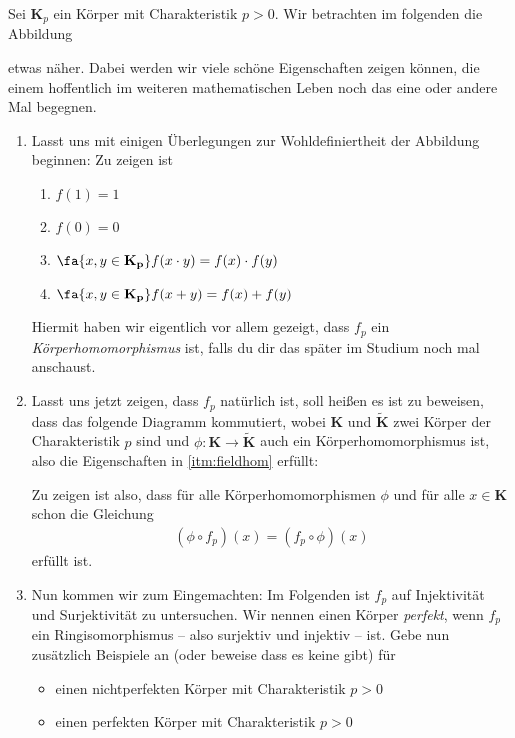 \begin{prob}
  Sei $\mathbf{K}_p$ ein Körper mit Charakteristik $p>0$. Wir betrachten im
  folgenden die Abbildung
  \begin{center}
    
  \end{center}
  etwas näher. Dabei werden wir viele schöne Eigenschaften zeigen können, die
  einem hoffentlich im weiteren mathematischen Leben noch das eine oder andere Mal
  begegnen.

  \begin{enumerate}[label=(\alph*)]
  \item \label{itm:fieldhom}Lasst uns mit einigen Überlegungen zur
    Wohldefiniertheit der Abbildung beginnen: Zu zeigen ist
    \begin{enumerate}[label=\roman*.]
    \item $f(1) = 1$
    \item $f(0) = 0$
    \item $\fa{x, y \in \mathbf{K_p}} f(x \cdot y) = f(x) \cdot f(y)$
    \item $\fa{x, y \in \mathbf{K_p}} f(x + y) = f(x) + f(y)$
    \end{enumerate}
    Hiermit haben wir eigentlich vor allem gezeigt, dass $f_p$ ein
    \emph{Körperhomomorphismus} ist, falls du dir das später im Studium noch mal
    anschaust.

  \item Lasst uns jetzt zeigen, dass $f_p$ natürlich ist, soll heißen es ist zu
    beweisen, dass das folgende Diagramm kommutiert, wobei $\mathbf{K}$ und
    $\widetilde{\mathbf{K}}$ zwei Körper der Charakteristik $p$ sind und
    $\phi \colon \mathbf{K} \to \widetilde{\mathbf{K}}$ auch ein
    Körperhomomorphismus ist, also die Eigenschaften in \ref{itm:fieldhom}
    erfüllt:
    \begin{center}
      
    \end{center}
    Zu zeigen ist also, dass für alle Körperhomomorphismen $\phi$ und für alle
    $x \in \mathbf{K}$ schon die Gleichung
    \begin{equation*}
      \begin{split}
        \left( \phi \circ f_p \right)(x)= \left( f_p \circ \phi \right)(x)
      \end{split}
    \end{equation*}
    erfüllt ist.

  \item Nun kommen wir zum Eingemachten: Im Folgenden ist $f_p$ auf Injektivität
    und Surjektivität zu untersuchen. Wir nennen einen Körper \emph{perfekt},
    wenn $f_p$ ein Ringisomorphismus -- also surjektiv und injektiv -- ist. Gebe
    nun zusätzlich Beispiele an (oder beweise dass es keine gibt) für
    \begin{itemize}
    \item einen nichtperfekten Körper mit Charakteristik $p > 0$
    \item einen perfekten Körper mit Charakteristik $p > 0$
    \end{itemize}


\end{enumerate}
\end{prob}
